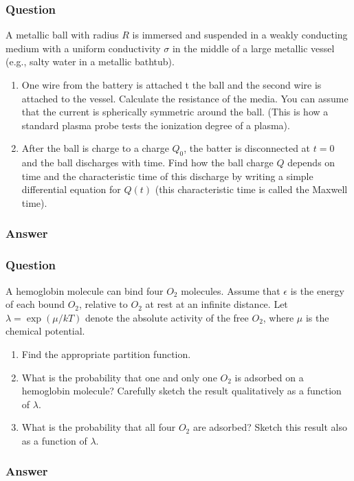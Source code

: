 \subsubsection{Question}
	A metallic ball with radius $R$ is immersed and suspended in a weakly conducting medium with a uniform conductivity $\sigma$ in the middle of a large metallic vessel (e.g., salty water in a metallic bathtub).
	\begin{enumerate}
		\item One wire from the battery is attached t the ball and the second wire is attached to the vessel. Calculate the resistance of the media. You can assume that the current is spherically symmetric around the ball. (This is how a standard plasma probe tests the ionization degree of a plasma).
		\item After the ball is charge to a charge $Q_0$, the batter is disconnected at $t=0$ and the ball discharges with time. Find how the ball charge $Q$ depends on time and the characteristic time of this discharge by writing a simple differential equation for $Q(t)$ (this characteristic time is called the Maxwell time). 
	\end{enumerate}
\subsubsection{Answer}


\subsubsection{Question}
	A hemoglobin molecule can bind four $O_2$ molecules. Assume that $\epsilon$ is the energy of each bound $O_2$, relative to $O_2$ at rest at an infinite distance. Let $\lambda=\exp(\mu/kT)$ denote the absolute activity of the free $O_2$, where $\mu$ is the chemical potential.
	\begin{enumerate}
		\item Find the appropriate partition function.
		\item What is the probability that one and only one $O_2$ is adsorbed on a hemoglobin molecule? Carefully sketch the result qualitatively as a function of $\lambda$. 
		\item What is the probability that all four $O_2$ are adsorbed? Sketch this result also as a function of $\lambda$. 
	\end{enumerate}
\subsubsection{Answer}

